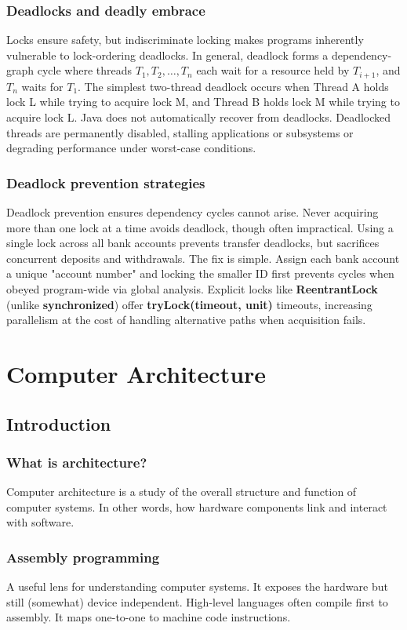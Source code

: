 \documentclass[11pt]{article}
\begin{document}
\subsubsection{Deadlocks and deadly embrace}
Locks ensure safety, but indiscriminate locking makes programs inherently vulnerable to lock-ordering deadlocks. 
In general, deadlock forms a dependency-graph cycle where threads $T_1,T_2,\dots,T_n$ each wait for a resource held by $T_{i+1}$, and $T_n$ waits for $T_1$.
The simplest two-thread deadlock occurs when Thread A holds lock L while trying to acquire lock M, and Thread B holds lock M while trying to acquire lock L.
Java does not automatically recover from deadlocks. Deadlocked threads are permanently disabled, stalling applications or subsystems or degrading performance under worst-case conditions.
\subsubsection{Deadlock prevention strategies}
Deadlock prevention ensures dependency cycles cannot arise. Never acquiring more than one lock at a time avoids deadlock, though often impractical.
Using a single lock across all bank accounts prevents transfer deadlocks, but sacrifices concurrent deposits and withdrawals. 
The fix is simple. Assign each bank account a unique "account number" and locking the smaller ID first prevents cycles when obeyed program-wide via global analysis.
Explicit locks like \textbf{ReentrantLock} (unlike \textbf{synchronized}) offer \textbf{tryLock(timeout, unit)} timeouts, increasing parallelism at the cost of handling alternative paths when acquisition fails.

\newpage
\section{Computer Architecture}
\subsection{Introduction}
\subsubsection{What is architecture?}
Computer architecture is a study of the overall structure and function of computer systems. In other words, how hardware components link and interact with software.

\subsubsection{Assembly programming}
A useful lens for understanding computer systems. It exposes the hardware but still (somewhat) device independent. 
High-level languages often compile first to assembly. It maps one-to-one to machine code instructions.
\end{document}

